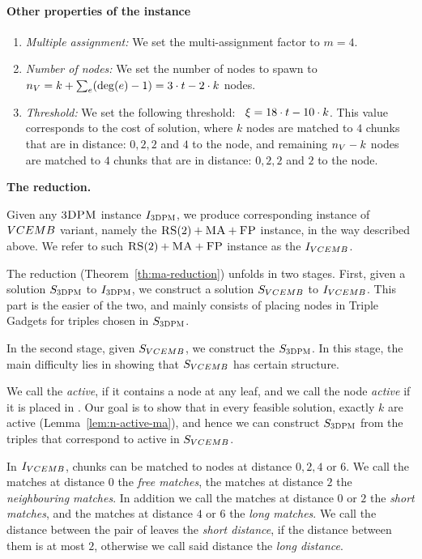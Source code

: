 \paragraph{Other properties of the instance}
\begin{enumerate}
  \item \emph{Multiple assignment:} We set the multi-assignment factor to $m=4$.
  \item \emph{Number of nodes:} We set the number of nodes to spawn to
 ~$n_V = k + \sum_{e}(\deg(e)-1) = 3\cdot t - 2\cdot k$ nodes.
 \item \emph{Threshold:} We set the following threshold:
 ~$\xi = 18\cdot t - 10\cdot k$.
 This value corresponds to the cost of solution, where $k$ nodes are matched to $4$ chunks that are in distance: $0, 2, 2$ and $4$ to the node, and remaining $n_V-k$ nodes are matched to $4$ chunks that are in distance: $0, 2, 2$ and $2$ to the node.
\end{enumerate}

\textbf{The reduction.}

Given any $\textsc{3DPM}$ instance $I_{\textsc{3DPM}}$, we produce corresponding instance of $VCEMB$ variant, namely the $\textsc{RS}(2)+\textsc{MA}+\textsc{FP}$ instance, in the way described above.
We refer to such $\textsc{RS}(2)+\textsc{MA}+\textsc{FP}$ instance as the $I_{VCEMB}$.

The reduction (Theorem~\ref{th:ma-reduction}) unfolds in two stages.
First, given a solution $S_{\textsc{3DPM}}$ to $I_{\textsc{3DPM}}$, we construct a solution $S_{VCEMB}$ to $I_{VCEMB}$.
This part is the easier of the two, and mainly consists of placing nodes in Triple Gadgets for triples chosen in $S_{\textsc{3DPM}}$.

In the second stage, given $S_{VCEMB}$, we construct the $S_{\textsc{3DPM}}$.
In this stage, the main difficulty lies in showing that $S_{VCEMB}$ has certain structure.

We call the {\TripleGadget} \textit{active}, if it contains a node at any leaf, and we call the node \textit{active} if it is placed in {\TripleGadget}.
Our goal is to show that in every feasible solution, exactly $k$ \TripleGadgets{} are active (Lemma~\ref{lem:n-active-ma}), and hence we can construct $S_{\textsc{3DPM}}$ from the triples that correspond to active \TripleGadgets{} in $S_{VCEMB}$.

In $I_{VCEMB}$, chunks can be matched to nodes at distance $0, 2, 4$ or $6$.
  We call the matches at distance $0$ the \emph{free matches}, the matches at distance $2$ the \emph{neighbouring matches}.
  In addition we call the matches at distance $0$ or $2$ the \emph{short matches}, and the matches at distance $4$ or $6$ the \emph{long matches}.
  We call the distance between the pair of leaves the \emph{short distance}, if the distance between them is at most $2$, otherwise we call said distance the \emph{long distance}.

